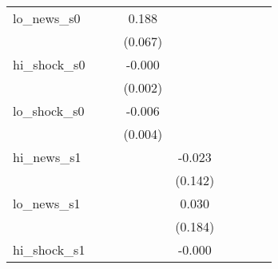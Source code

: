 {\begin{tabular}{l*{8}{c}}
\addlinespace
lo\_news\_s0  &                     &                     &       0.188\sym{***}&                     &                     &                     &                     &                     \\
            &                     &                     &     (0.067)         &                     &                     &                     &                     &                     \\
\addlinespace
hi\_shock\_s0 &                     &                     &      -0.000         &                     &                     &                     &                     &                     \\
            &                     &                     &     (0.002)         &                     &                     &                     &                     &                     \\
\addlinespace
lo\_shock\_s0 &                     &                     &      -0.006         &                     &                     &                     &                     &                     \\
            &                     &                     &     (0.004)         &                     &                     &                     &                     &                     \\
\addlinespace
hi\_news\_s1  &                     &                     &                     &      -0.023         &                     &                     &                     &                     \\
            &                     &                     &                     &     (0.142)         &                     &                     &                     &                     \\
\addlinespace
lo\_news\_s1  &                     &                     &                     &       0.030         &                     &                     &                     &                     \\
            &                     &                     &                     &     (0.184)         &                     &                     &                     &                     \\
\addlinespace
hi\_shock\_s1 &                     &                     &                     &      -0.000         &                     &                     &                     &                     \\

\end{tabular}}
